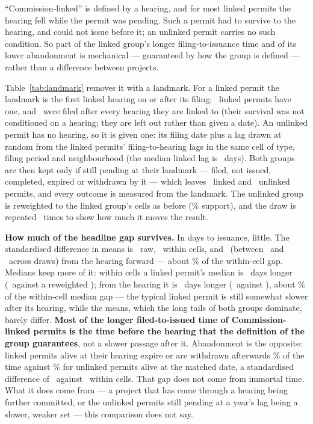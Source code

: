 \documentclass[11pt]{article}
\begin{document}
``Commission-linked'' is defined by a hearing, and for most linked permits the hearing fell
while the permit was pending. Such a permit had to survive to the hearing, and could not issue
before it; an unlinked permit carries no such condition. So part of the linked group's longer
filing-to-issuance time and of its lower abandonment is mechanical --- guaranteed by how the
group is defined --- rather than a difference between projects.

Table~\ref{tab:landmark} removes it with a landmark. For a linked permit the landmark is the
first linked hearing on or after its filing; \pcLmLinkedWith\ linked permits have one, and
\pcLmLinkedAfter\ were filed after every hearing they are linked to (their survival was not
conditioned on a hearing; they are left out rather than given a date). An unlinked permit has
no hearing, so it is given one: its filing date plus a lag drawn at random from the linked
permits' filing-to-hearing lags in the same cell of type, filing period and neighbourhood (the
median linked lag is \pcLmLagMed\ days). Both groups are then kept only if still pending at
their landmark --- filed, not issued, completed, expired or withdrawn by it --- which leaves
\pcLmLinkedAlive\ linked and \pcLmUnlinkedAlive\ unlinked permits, and every outcome is measured
from the landmark. The unlinked group is reweighted to the linked group's cells as before
(\pcLmSupport\% support), and the draw is repeated \pcLmDraws\ times to show how much it moves
the result.

\textbf{How much of the headline gap survives.} In days to issuance, little. The
standardised difference in means is \pcSdDaysRaw\ raw, \pcSdDaysCell\ within cells, and
\pcLmSdDays\ (between \pcLmSdDaysLo\ and \pcLmSdDaysHi\ across draws) from the hearing forward
--- about \pcLmSurviveDays\% of the within-cell gap. Medians keep more of it: within cells a
linked permit's median is \pcCellMedGap\ days longer (\pcLinkedDays\ against a reweighted
\pcCellDaysMedB); from the hearing it is \pcLmMedGap\ days longer (\pcLmDaysMedA\ against
\pcLmDaysMedB), about \pcLmMedSurvive\% of the within-cell median gap --- the typical linked
permit is still somewhat slower after its hearing, while the means, which the long tails of
both groups dominate, barely differ. \textbf{Most of the longer filed-to-issued time of
Commission-linked permits is the time before the hearing that the definition of the group
guarantees}, not a slower passage after it. Abandonment is the opposite: linked permits alive at their hearing expire or are
withdrawn afterwards \pcLmExitA\% of the time against \pcLmExitB\% for unlinked permits alive at
the matched date, a standardised difference of \pcLmSdExit\ against \pcSdExitCell\ within cells.
That gap does not come from immortal time. What it does come from --- a project that has come
through a hearing being further committed, or the unlinked permits still pending at a year's lag
being a slower, weaker set --- this comparison does not say.
\end{document}
